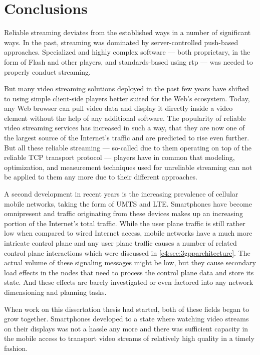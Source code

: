 \chapter{Conclusions}
\label{chap:conclusion}

Reliable streaming deviates from the established ways in a number of significant ways. In the past, streaming was dominated by server-controlled push-based approaches. Specialized and highly complex software --- both proprietary, in the form of Flash and other players, and standards-based using \gls{rtp} --- was needed to properly conduct streaming. 

But many video streaming solutions deployed in the past few years have shifted to using simple client-side players better suited for the Web's ecosystem. Today, any Web browser can pull video data and display it directly inside a video element without the help of any additional software. The popularity of reliable video streaming services has increased in such a way, that they are now one of the largest source of the Internet's traffic and are predicted to rise even further. But all these reliable streaming --- so-called due to them operating on top of the reliable \gls{TCP} transport protocol --- players have in common that modeling, optimization, and measurement techniques used for unreliable streaming can not be applied to them any more due to their different approaches.

A second development in recent years is the increasing prevalence of cellular mobile networks, taking the form of \gls{UMTS} and \gls{LTE}. Smartphones have become omnipresent and traffic originating from these devices makes up an increasing portion of the Internet's total traffic. While the user plane traffic is still rather low when compared to wired Internet access, mobile networks have a much more intricate control plane and any user plane traffic causes a number of related control plane interactions which were discussed in \ref{c4:sec:3gpparchitecture}. The actual volume of these signaling messages might be low, but they cause secondary load effects in the nodes that need to process the control plane data and store its state. And these effects are barely investigated or even factored into any network dimensioning and planning tasks.

When work on this dissertation thesis had started, both of these fields began to grow together. Smartphones developed to a state where watching video streams on their displays was not a hassle any more and there was sufficient capacity in the mobile access to transport video streams of relatively high quality in a timely fashion.

